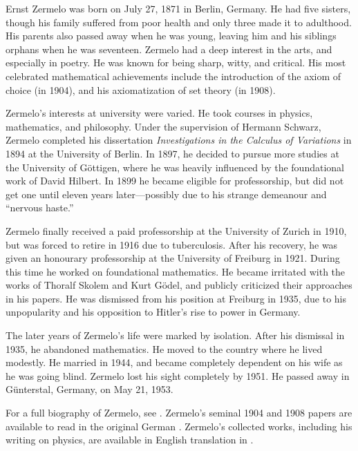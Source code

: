 \documentclass[../../../include/open-logic-section]{subfiles}
\begin{document}



Ernst Zermelo was born on July 27, 1871 in Berlin, Germany. He had
five sisters, though his family suffered from poor health and only
three made it to adulthood. His parents also passed away when he was
young, leaving him and his siblings orphans when he was seventeen.
Zermelo had a deep interest in the arts, and especially in poetry. He
was known for being sharp, witty, and critical. His most celebrated
mathematical achievements include the introduction of the axiom of
choice (in 1904), and his axiomatization of set theory (in 1908).

Zermelo's interests at university were varied. He took courses in
physics, mathematics, and philosophy. Under the supervision of Hermann
Schwarz, Zermelo completed his dissertation \emph{Investigations in
  the Calculus of Variations} in 1894 at the University of Berlin. In
1897, he decided to pursue more studies at the University of
G\"{o}ttigen, where he was heavily influenced by the foundational work
of David Hilbert. In 1899 he became eligible for professorship, but
did not get one until eleven years later---possibly due to his strange
demeanour and ``nervous haste.''

Zermelo finally received a paid professorship at the University of
Zurich in 1910, but was forced to retire in 1916 due to
tuberculosis. After his recovery, he was given an honourary
professorship at the University of Freiburg in 1921. During this time
he worked on foundational mathematics.  He became irritated with the
works of Thoralf Skolem and Kurt G\"{o}del, and publicly criticized
their approaches in his papers.  He was dismissed from his position at
Freiburg in 1935, due to his unpopularity and his opposition to
Hitler's rise to power in Germany.
 
The later years of Zermelo's life were marked by isolation. After his
dismissal in 1935, he abandoned mathematics. He moved to the country
where he lived modestly. He married in 1944, and became completely
dependent on his wife as he was going blind. Zermelo lost his sight
completely by 1951. He passed away in G\"{u}nterstal, Germany, on May
21, 1953.

\begin{reading}
For a full biography of Zermelo, see \citet{Ebbinghaus2015}.
Zermelo's seminal 1904 and 1908 papers are available to read in the
original German \citep{Zermelo1904,Zermelo1908}.  Zermelo's collected
works, including his writing on physics, are available in English
translation in \citet{Ebbinghaus2010,Ebbinghaus2013}.
\end{reading}
\end{document}
